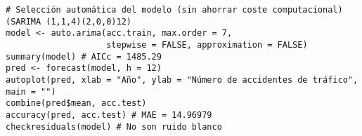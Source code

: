 \documentclass[12pt,a4paper,oneside]{article}
\begin{document}
\begin{Verbatim}[fontsize=\footnotesize]
# Selección automática del modelo (sin ahorrar coste computacional) (SARIMA (1,1,4)(2,0,0)12)
model <- auto.arima(acc.train, max.order = 7,
                    stepwise = FALSE, approximation = FALSE)
summary(model) # AICc = 1485.29
pred <- forecast(model, h = 12)
autoplot(pred, xlab = "Año", ylab = "Número de accidentes de tráfico", main = "")
combine(pred$mean, acc.test)
accuracy(pred, acc.test) # MAE = 14.96979
checkresiduals(model) # No son ruido blanco
\end{Verbatim} 
\end{document}
